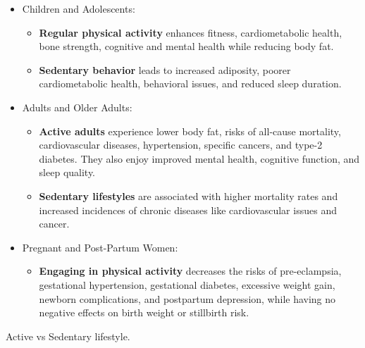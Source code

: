 \begin{table}
    \begin{itemize}[nosep] %
        \item Children and Adolescents:\vspace{2ex}
              \begin{itemize}[nosep]
                  \item \textbf{Regular physical activity} enhances fitness, cardiometabolic health, bone strength, cognitive and mental health while reducing body fat.
                  \item \textbf{Sedentary behavior} leads to increased adiposity, poorer cardiometabolic health, behavioral issues, and reduced sleep duration.
              \end{itemize}
              \vspace{3ex}
        \item Adults and Older Adults:\vspace{2ex}
              \begin{itemize}[nosep]
                  \item \textbf{Active adults} experience lower body fat, risks of all-cause mortality, cardiovascular diseases, hypertension, specific cancers, and type-2 diabetes. They also enjoy improved mental health, cognitive function, and sleep quality.
                  \item \textbf{Sedentary lifestyles} are associated with higher mortality rates and increased incidences of chronic diseases like cardiovascular issues and cancer.
              \end{itemize}
              \vspace{3ex}
        \item Pregnant and Post-Partum Women:\vspace{2ex}
              \begin{itemize}[nosep]
                  \item \textbf{Engaging in physical activity} decreases the risks of pre-eclampsia, gestational hypertension, gestational diabetes, excessive weight gain, newborn complications, and postpartum depression, while having no negative effects on birth weight or stillbirth risk.
              \end{itemize}
    \end{itemize}
    \caption*{Active vs Sedentary lifestyle\cite{WhoPhysicalActivityBenefits}.}
\end{table}
